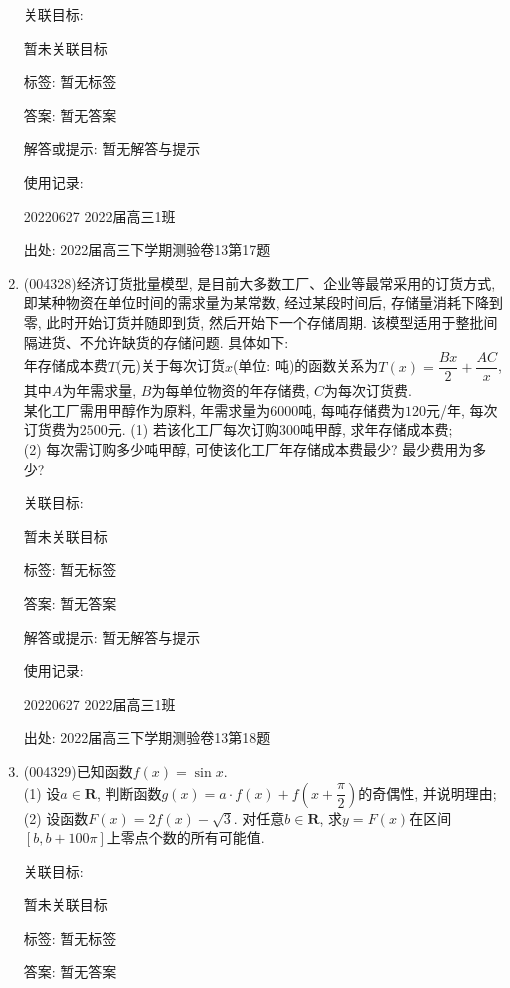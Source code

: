 \documentclass[10pt,a4paper]{article}
\begin{document}
\begin{enumerate}[1.]
关联目标:

暂未关联目标



标签: 暂无标签

答案: 暂无答案

解答或提示: 暂无解答与提示

使用记录:

20220627	2022届高三1班		


出处: 2022届高三下学期测验卷13第17题
\item { (004328)}经济订货批量模型, 是目前大多数工厂、企业等最常采用的订货方式, 即某种物资在单位时间的需求量为某常数, 经过某段时间后, 存储量消耗下降到零, 此时开始订货并随即到货, 然后开始下一个存储周期. 该模型适用于整批间隔进货、不允许缺货的存储问题. 具体如下:\\
年存储成本费$T$(元)关于每次订货$x$(单位: 吨)的函数关系为$T(x)=\dfrac{Bx}2+\dfrac{AC}x$, 其中$A$为年需求量, $B$为每单位物资的年存储费, $C$为每次订货费.\\
某化工厂需用甲醇作为原料, 年需求量为$6000$吨, 每吨存储费为$120$元/年, 每次订货费为$2500$元.
(1) 若该化工厂每次订购$300$吨甲醇, 求年存储成本费;\\
(2) 每次需订购多少吨甲醇, 可使该化工厂年存储成本费最少? 最少费用为多少?


关联目标:

暂未关联目标



标签: 暂无标签

答案: 暂无答案

解答或提示: 暂无解答与提示

使用记录:

20220627	2022届高三1班		


出处: 2022届高三下学期测验卷13第18题
\item { (004329)}已知函数$f(x)=\sin x$.\\
(1) 设$a\in \mathbf{R}$, 判断函数$g(x)=a\cdot f(x)+f(x+\dfrac{\pi}2)$的奇偶性, 并说明理由;\\
(2) 设函数$F(x)=2f(x)-\sqrt 3$. 对任意$b\in \mathbf{R}$, 求$y=F(x)$在区间$[b,b+100\pi]$上零点个数的所有可能值.


关联目标:

暂未关联目标



标签: 暂无标签

答案: 暂无答案


\end{enumerate}
\end{document}
